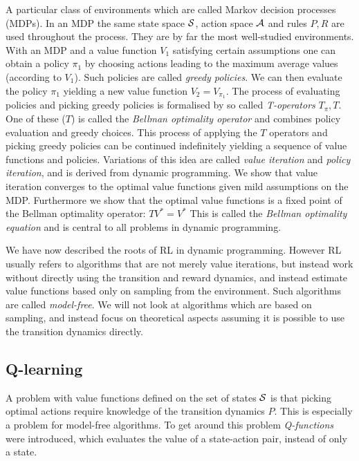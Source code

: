 A particular class of environments which are called Markov decision processes
(MDPs).
In an MDP the same state space $\mathcal{S}$, action space $\mathcal{A}$ and rules
$P, R$ are used throughout the process.
They are by far the most well-studied environments.
With an MDP and a value function $V_1$ satisfying certain assumptions 
one can obtain a policy $\pi_1$ by choosing actions
leading to the maximum average values (according to $V_1$).
Such policies are called \emph{greedy policies}.
We can then evaluate the policy $\pi_1$
yielding a new value function $V_2 = V_{\pi_1}$.
The process of evaluating policies and picking greedy policies
is formalised by so called \emph{T-operators} $T_\pi, T$.
One of these ($T$) is called the \emph{Bellman optimality operator}
and combines policy evaluation and greedy choices.
This process of applying the $T$ operators and picking greedy policies
can be continued indefinitely yielding a sequence of value
functions and policies.
Variations of this idea are called \emph{value iteration} and
\emph{policy iteration},
and is derived from dynamic programming.
We show that value iteration converges to the optimal value functions
given mild assumptions on the MDP.
Furthermore we show that the optimal value functions is a fixed point
of the Bellman optimality operator: $TV^* = V^*$
This is called the \emph{Bellman optimality equation} and
is central to all problems in dynamic programming.

We have now described the roots of RL in dynamic programming.
However RL usually refers to algorithms that
are not merely value iterations, but instead work without
directly using the transition and reward dynamics,
and instead estimate value functions based only on sampling from the
environment. Such algorithms are called \emph{model-free}.
We will not look at algorithms which are based on sampling, and instead focus
on theoretical aspects assuming it is possible to use the transition dynamics
directly.

\subsection{Q-learning}

A problem with value functions defined on the set of states $\mathcal{S}$ is that
picking optimal actions require knowledge of the transition dynamics $P$.
This is especially a problem for model-free algorithms.
To get around this problem \emph{Q-functions} were introduced, which evaluates
the value of a state-action pair, instead of only a state.

